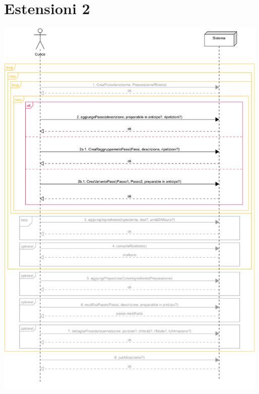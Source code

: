 \section*{Estensioni 2}
\begin{center}
  \includegraphics[max width=\textwidth, max height=190mm]{../resources/img/GRP/SSD/ext2.png}
\end{center}

